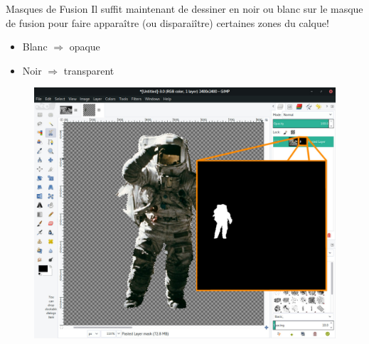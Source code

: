 \documentclass[10pt,svgnames,usenames,table]{beamer}
\begin{document}
	\begin{frame}{Masques de Fusion}
		Il suffit maintenant de dessiner en noir ou blanc sur le masque de fusion pour faire apparaître (ou disparaiître) certaines zones du calque!
		\begin{itemize}
			\item Blanc $\Longrightarrow $ opaque
			\item Noir $ \Longrightarrow $ transparent
		\end{itemize}
		\begin{center}
			\begin{figure}
				\includegraphics[scale=.15]{Images/mask/mask3}		
			\end{figure}
		\end{center}
	\end{frame}
	
\end{document}

